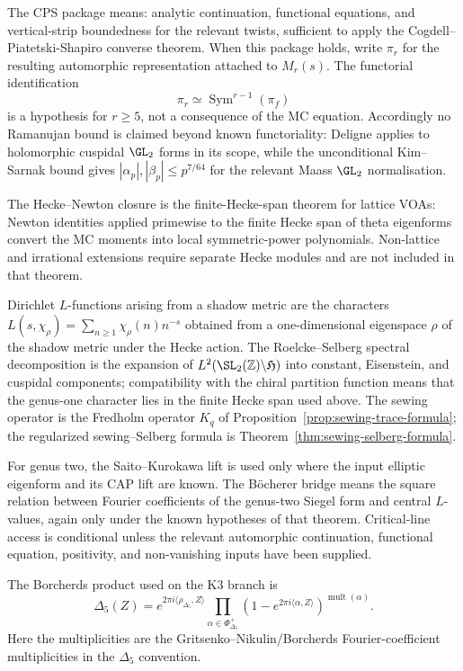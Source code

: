 \begin{proposition}
The CPS package means: analytic continuation, functional equations,
and vertical-strip boundedness for the relevant twists, sufficient to
apply the Cogdell--Piatetski-Shapiro converse theorem.  When this
package holds, write \(\pi_r\) for the resulting automorphic
representation attached to \(M_r(s)\).  The functorial
identification
\begin{equation}
\label{eq:as-symmetric-power-functoriality-ledger}
\pi_r\simeq\operatorname{Sym}^{r-1}(\pi_f)
\end{equation}
is a hypothesis for \(r\ge5\), not a consequence of the MC equation.
Accordingly no Ramanujan bound is claimed beyond known functoriality:
Deligne applies to holomorphic cuspidal \(\GL_2\) forms in its
scope, while the unconditional Kim--Sarnak bound gives
\(|\alpha_p|,|\beta_p|\le p^{7/64}\) for the relevant Maass
\(\GL_2\) normalisation.

The Hecke--Newton closure is the finite-Hecke-span theorem for lattice
VOAs: Newton identities applied primewise to the finite Hecke span of
theta eigenforms convert the MC moments into local symmetric-power
polynomials.  Non-lattice and irrational extensions require separate
Hecke modules and are not included in that theorem.

Dirichlet \(L\)-functions arising from a shadow metric are the
characters \(L(s,\chi_\rho)=\sum_{n\ge1}\chi_\rho(n)n^{-s}\) obtained
from a one-dimensional eigenspace \(\rho\) of the shadow metric under
the Hecke action.  The Roelcke--Selberg spectral decomposition is the
expansion of \(L^2(\SL_2(\mathbb Z)\backslash\mathfrak H)\) into
constant, Eisenstein, and cuspidal components; compatibility with the
chiral partition function means that the genus-one character lies in
the finite Hecke span used above.  The sewing operator is the
Fredholm operator \(K_q\) of Proposition~\ref{prop:sewing-trace-formula};
the regularized sewing--Selberg formula is
Theorem~\ref{thm:sewing-selberg-formula}.

For genus two, the Saito--Kurokawa lift is used only where the
input elliptic eigenform and its CAP lift are known.  The B\"ocherer
bridge means the square relation between Fourier coefficients of the
genus-two Siegel form and central \(L\)-values, again only under the
known hypotheses of that theorem.  Critical-line access is conditional
unless the relevant automorphic continuation, functional equation,
positivity, and non-vanishing inputs have been supplied.

The Borcherds product used on the K3 branch is
\begin{equation}
\label{eq:as-delta5-borcherds-product-ledger}
\Delta_5(Z)
=
e^{2\pi i\langle\rho_{\Delta_5},Z\rangle}
\prod_{\alpha\in\Phi^+_{\Delta_5}}
\left(1-e^{2\pi i\langle\alpha,Z\rangle}\right)^{
\operatorname{mult}(\alpha)}.
\end{equation}
Here the multiplicities are the Gritsenko--Nikulin/Borcherds
Fourier-coefficient multiplicities in the \(\Delta_5\) convention.
\end{proposition}

